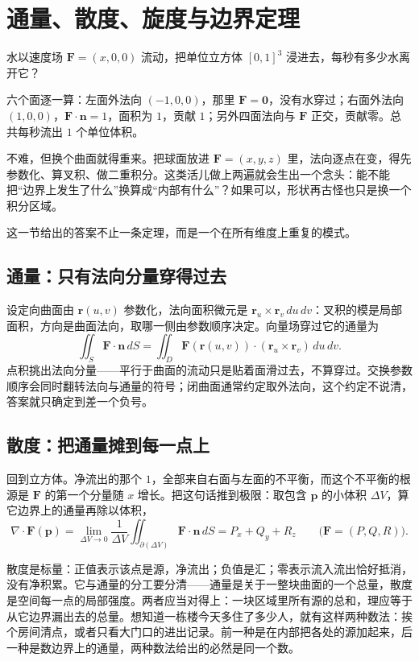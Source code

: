 \section{通量、散度、旋度与边界定理}
\label{sec:02-Calculus/06-Multivariable-Calculus/09}

水以速度场 \(\mathbf F=(x,0,0)\) 流动，把单位立方体 \([0,1]^3\) 浸进去，每秒有多少水离开它？

六个面逐一算：左面外法向 \((-1,0,0)\)，那里 \(\mathbf F=\mathbf 0\)，没有水穿过；右面外法向 \((1,0,0)\)，\(\mathbf F\cdot\mathbf n=1\)，面积为 \(1\)，贡献 \(1\)；另外四面法向与 \(\mathbf F\) 正交，贡献零。总共每秒流出 \(1\) 个单位体积。

不难，但换个曲面就得重来。把球面放进 \(\mathbf F=(x,y,z)\) 里，法向逐点在变，得先参数化、算叉积、做二重积分。这类活儿做上两遍就会生出一个念头：能不能把``边界上发生了什么''换算成``内部有什么''？如果可以，形状再古怪也只是换一个积分区域。

这一节给出的答案不止一条定理，而是一个在所有维度上重复的模式。

\subsection{通量：只有法向分量穿得过去}

设定向曲面由 \(\mathbf r(u,v)\) 参数化，法向面积微元是 \(\mathbf r_u\times\mathbf r_v\,du\,dv\)：叉积的模是局部面积，方向是曲面法向，取哪一侧由参数顺序决定。向量场穿过它的通量为
\[
\iint_S\mathbf F\cdot\mathbf n\,dS
=\iint_D\mathbf F(\mathbf r(u,v))\cdot(\mathbf r_u\times\mathbf r_v)\,du\,dv .
\]
点积挑出法向分量——平行于曲面的流动只是贴着面滑过去，不算穿过。交换参数顺序会同时翻转法向与通量的符号；闭曲面通常约定取外法向，这个约定不说清，答案就只确定到差一个负号。

\subsection{散度：把通量摊到每一点上}

回到立方体。净流出的那个 \(1\)，全部来自右面与左面的不平衡，而这个不平衡的根源是 \(\mathbf F\) 的第一个分量随 \(x\) 增长。把这句话推到极限：取包含 \(\mathbf p\) 的小体积 \(\Delta V\)，算它边界上的通量再除以体积，
\[
\nabla\cdot\mathbf F(\mathbf p)
=\lim_{\Delta V\to0}\frac{1}{\Delta V}\iint_{\partial(\Delta V)}\mathbf F\cdot\mathbf n\,dS
=P_x+Q_y+R_z
\qquad\bigl(\mathbf F=(P,Q,R)\bigr).
\]

散度是标量：正值表示该点是源，净流出；负值是汇；零表示流入流出恰好抵消，没有净积累。它与通量的分工要分清——通量是关于一整块曲面的一个总量，散度是空间每一点的局部强度。两者应当对得上：一块区域里所有源的总和，理应等于从它边界漏出去的总量。想知道一栋楼今天多住了多少人，就有这样两种数法：挨个房间清点，或者只看大门口的进出记录。前一种是在内部把各处的源加起来，后一种是数边界上的通量，两种数法给出的必然是同一个数。

